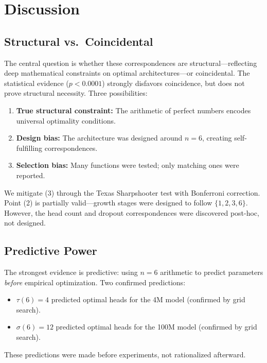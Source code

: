 \documentclass[12pt]{article}
\begin{document}
\section{Discussion}

\subsection{Structural vs.\ Coincidental}

The central question is whether these correspondences are structural---reflecting deep mathematical constraints on optimal architectures---or coincidental. The statistical evidence ($p < 0.0001$) strongly disfavors coincidence, but does not prove structural necessity. Three possibilities:

\begin{enumerate}
    \item \textbf{True structural constraint:} The arithmetic of perfect numbers encodes universal optimality conditions.
    \item \textbf{Design bias:} The architecture was designed around $n = 6$, creating self-fulfilling correspondences.
    \item \textbf{Selection bias:} Many functions were tested; only matching ones were reported.
\end{enumerate}

We mitigate (3) through the Texas Sharpshooter test with Bonferroni correction. Point (2) is partially valid---growth stages were designed to follow $\{1, 2, 3, 6\}$. However, the head count and dropout correspondences were discovered post-hoc, not designed.

\subsection{Predictive Power}

The strongest evidence is predictive: using $n = 6$ arithmetic to predict parameters \emph{before} empirical optimization. Two confirmed predictions:

\begin{itemize}
    \item $\tau(6) = 4$ predicted optimal heads for the 4M model (confirmed by grid search).
    \item $\sigma(6) = 12$ predicted optimal heads for the 100M model (confirmed by grid search).
\end{itemize}

These predictions were made before experiments, not rationalized afterward.
\end{document}
